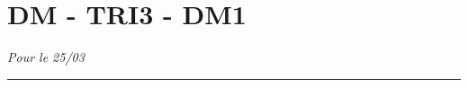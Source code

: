 \documentclass[11pt]{article}
\newcommand{\horrule}[1]{\rule{\linewidth}{#1}} %
\begin{document}

\newtheorem{Definition}{Définition}
\newtheorem{Theorem}{Théorème}
\newtheorem{Proposition}{Propriété}

\renewcommand{\labelitemi}{$\bullet$}
\renewcommand{\labelitemii}{$\circ$}

\setlength{\columnseprule}{0pt}

\section*{DM - TRI3 - DM1}
\textit{Pour le 25/03}
\horrule{2px} 
\end{document}
